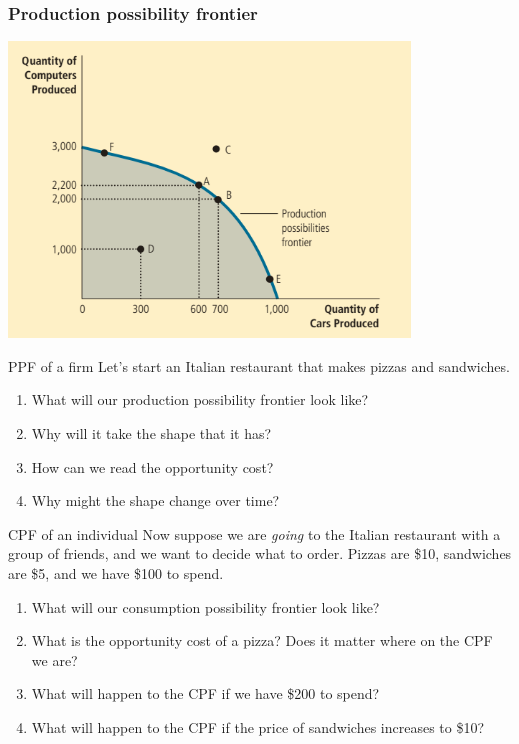 \documentclass{beamer}
\begin{document}
\begin{frame}
    \frametitle{Production possibility frontier}
    \centering
    \includegraphics[width = 0.8\textwidth,keepaspectratio]{model2.png}
\end{frame}

\begin{frame}{PPF of a firm}
    Let's start an Italian restaurant that makes pizzas and sandwiches.
    \begin{enumerate}
        \item What will our production possibility frontier look like?
        \item Why will it take the shape that it has?
        \item How can we read the opportunity cost?
        \item Why might the shape change over time?
    \end{enumerate}
\end{frame}

\begin{frame}{CPF of an individual}
    Now suppose we are \textit{going} to the Italian restaurant with a group of friends, and we want to decide what to order. Pizzas are \$10, sandwiches are \$5, and we have \$100 to spend.
    \begin{enumerate}
        \item What will our consumption possibility frontier look like?
        \item What is the opportunity cost of a pizza? Does it matter where on the CPF we are?
        \item What will happen to the CPF if we have \$200 to spend?
        \item What will happen to the CPF if the price of sandwiches increases to \$10?
    \end{enumerate}
\end{frame}
\end{document}
